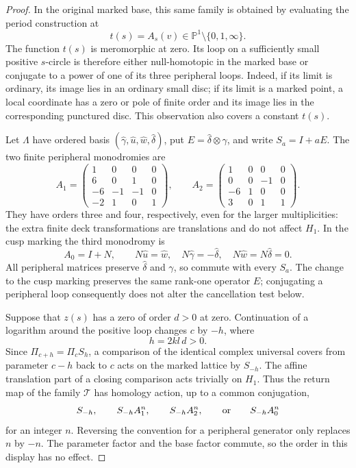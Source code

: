 \begin{proof}
In the original marked base, this same family is obtained
by evaluating the period construction at
\[
 t(s)=A_s(v)\in\mathbb P^1\setminus\{0,1,\infty\}.
\]
The function $t(s)$ is meromorphic at zero.  Its loop on a
sufficiently small positive $s$-circle is therefore either
null-homotopic in the marked base or conjugate to a power
of one of its three peripheral loops.  Indeed, if its
limit is ordinary, its image lies in an ordinary small
disc; if its limit is a marked point, a local coordinate
has a zero or pole of finite order and its image lies
in the corresponding punctured disc.  This observation
also covers a constant $t(s)$.

Let $\Lambda$ have ordered basis
$(\widehat\gamma,\widehat u,\widehat w,\widehat\delta)$,
put $E=\widehat\delta\otimes\gamma$, and write
$S_a=I+aE$.  The two finite peripheral monodromies are
\[
 A_1=\begin{pmatrix}
 1&0&0&0\\6&0&1&0\\-6&-1&-1&0\\-2&1&0&1
 \end{pmatrix},\qquad
 A_2=\begin{pmatrix}
 1&0&0&0\\0&0&-1&0\\-6&1&0&0\\3&0&1&1
 \end{pmatrix}.
\]
They have orders three and four, respectively, even for
the larger multiplicities: the extra finite deck
transformations are translations and do not affect
$H_1$.  In the cusp marking the third monodromy is
\[
 A_0=I+N,\qquad
 N\widehat u=\widehat w,\quad
 N\widehat\gamma=-\widehat\delta,\quad
 N\widehat w=N\widehat\delta=0.
\]
All peripheral matrices preserve $\widehat\delta$ and
$\gamma$, so commute with every $S_a$.  The change to
the cusp marking preserves the same rank-one operator
$E$; conjugating a peripheral loop consequently does
not alter the cancellation test below.

Suppose that $z(s)$ has a zero of order $d>0$ at zero.
Continuation of a logarithm around the positive loop
changes $c$ by $-h$, where
\[
 h=2kl\,d>0.
\]
Since $\Pi_{c+h}=\Pi_cS_h$, a comparison of the identical
complex universal covers from parameter $c-h$ back to
$c$ acts on the marked lattice by $S_{-h}$.
The affine translation part of a closing comparison
acts trivially on $H_1$.  Thus the return map of the
family $\mathcal T$ has homology action, up to a common
conjugation,
\[
 S_{-h},\qquad S_{-h}A_1^n,\qquad
 S_{-h}A_2^n,\qquad\hbox{or}\qquad S_{-h}A_0^n
\]
for an integer $n$.  Reversing the convention for a
peripheral generator only replaces $n$ by $-n$.
The parameter factor and the base factor commute, so
the order in this display has no effect.


\end{proof}
